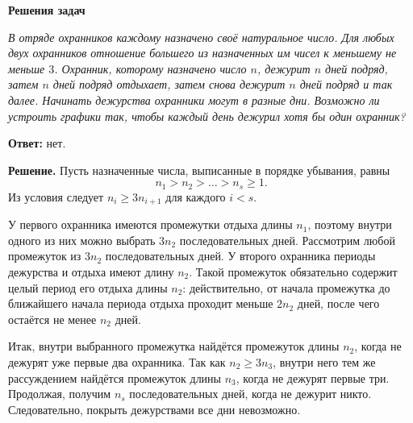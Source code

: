 \begin{center}
    {\Large\bfseries Решения задач}
\end{center}


\textit{В отряде охранников каждому назначено своё натуральное число. Для любых двух охранников отношение большего из назначенных им чисел к меньшему не меньше $3$. Охранник, которому назначено число $n$, дежурит $n$ дней подряд, затем $n$ дней подряд отдыхает, затем снова дежурит $n$ дней подряд и так далее. Начинать дежурства охранники могут в разные дни. Возможно ли устроить графики так, чтобы каждый день дежурил хотя бы один охранник?}

\textbf{Ответ:} нет.

\textbf{Решение.}
Пусть назначенные числа, выписанные в порядке убывания, равны
\[
 n_1>n_2>\dots>n_s\geq1.
\]
Из условия следует $n_i\geq3n_{i+1}$ для каждого $i<s$.

У первого охранника имеются промежутки отдыха длины $n_1$, поэтому внутри одного из них можно выбрать $3n_2$ последовательных дней. Рассмотрим любой промежуток из $3n_2$ последовательных дней. У второго охранника периоды дежурства и отдыха имеют длину $n_2$. Такой промежуток обязательно содержит целый период его отдыха длины $n_2$: действительно, от начала промежутка до ближайшего начала периода отдыха проходит меньше $2n_2$ дней, после чего остаётся не менее $n_2$ дней.

Итак, внутри выбранного промежутка найдётся промежуток длины $n_2$, когда не дежурят уже первые два охранника. Так как $n_2\geq3n_3$, внутри него тем же рассуждением найдётся промежуток длины $n_3$, когда не дежурят первые три. Продолжая, получим $n_s$ последовательных дней, когда не дежурит никто. Следовательно, покрыть дежурствами все дни невозможно.


